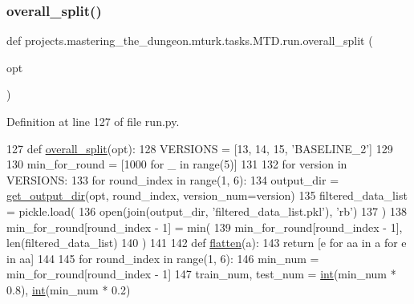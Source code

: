 \subsubsection{\texorpdfstring{overall\+\_\+split()}{overall\_split()}}
{\footnotesize\ttfamily def projects.\+mastering\+\_\+the\+\_\+dungeon.\+mturk.\+tasks.\+M\+T\+D.\+run.\+overall\+\_\+split (\begin{DoxyParamCaption}\item[{}]{opt }\end{DoxyParamCaption})}



Definition at line 127 of file run.\+py.


\begin{DoxyCode}
127 \textcolor{keyword}{def }\hyperlink{namespaceprojects_1_1mastering__the__dungeon_1_1mturk_1_1tasks_1_1MTD_1_1run_a68c9d28aae4d256af00522c8617f93f1}{overall\_split}(opt):
128     VERSIONS = [13, 14, 15, \textcolor{stringliteral}{'BASELINE\_2'}]
129 
130     min\_for\_round = [1000 \textcolor{keywordflow}{for} \_ \textcolor{keywordflow}{in} range(5)]
131 
132     \textcolor{keywordflow}{for} version \textcolor{keywordflow}{in} VERSIONS:
133         \textcolor{keywordflow}{for} round\_index \textcolor{keywordflow}{in} range(1, 6):
134             output\_dir = \hyperlink{namespaceprojects_1_1mastering__the__dungeon_1_1mturk_1_1tasks_1_1MTD_1_1run_a7f8196f264013bc16be3e85fe5c68f0d}{get\_output\_dir}(opt, round\_index, version\_num=version)
135             filtered\_data\_list = pickle.load(
136                 open(join(output\_dir, \textcolor{stringliteral}{'filtered\_data\_list.pkl'}), \textcolor{stringliteral}{'rb'})
137             )
138             min\_for\_round[round\_index - 1] = min(
139                 min\_for\_round[round\_index - 1], len(filtered\_data\_list)
140             )
141 
142     \textcolor{keyword}{def }\hyperlink{namespaceprojects_1_1controllable__dialogue_1_1controllable__seq2seq_1_1controls_a0db4b9d9584cef90aa2515a75e741774}{flatten}(a):
143         \textcolor{keywordflow}{return} [e \textcolor{keywordflow}{for} aa \textcolor{keywordflow}{in} a \textcolor{keywordflow}{for} e \textcolor{keywordflow}{in} aa]
144 
145     \textcolor{keywordflow}{for} round\_index \textcolor{keywordflow}{in} range(1, 6):
146         min\_num = min\_for\_round[round\_index - 1]
147         train\_num, test\_num = \hyperlink{namespaceprojects_1_1mastering__the__dungeon_1_1mturk_1_1tasks_1_1MTD_1_1run_a693eb03afbb820bbfe8b47b12e69e519}{int}(min\_num * 0.8), \hyperlink{namespaceprojects_1_1mastering__the__dungeon_1_1mturk_1_1tasks_1_1MTD_1_1run_a693eb03afbb820bbfe8b47b12e69e519}{int}(min\_num * 0.2)

\end{DoxyCode}
